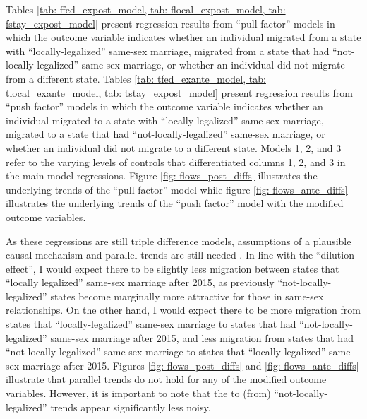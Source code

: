 \documentclass[12pt,letterpaper]{article}
\begin{document}
Tables \ref{tab: ffed_expost_model, tab: flocal_expost_model, tab: fstay_expost_model} present regression results from “pull factor” models in which the outcome variable indicates whether an individual migrated from a state with “locally-legalized” same-sex marriage, migrated from a state that had “not-locally-legalized” same-sex marriage, or whether an individual did not migrate from a different state. Tables \ref{tab: tfed_exante_model, tab: tlocal_exante_model, tab: tstay_expost_model} present regression results from “push factor” models in which the outcome variable indicates whether an individual migrated to a state with “locally-legalized” same-sex marriage, migrated to a state that had “not-locally-legalized” same-sex marriage, or whether an individual did not migrate to a different state. Models 1, 2, and 3 refer to the varying levels of controls that differentiated columns 1, 2, and 3 in the main model regressions.  Figure \ref{fig: flows_post_diffs} illustrates the underlying trends of the “pull factor” model while figure \ref{fig: flows_ante_diffs} illustrates the underlying trends of the “push factor” model with the modified outcome variables.

As these regressions are still triple difference models, assumptions of a plausible causal mechanism and parallel trends are still needed \citep{24, 25}. In line with the “dilution effect”, I would expect there to be slightly less migration between states that “locally legalized” same-sex marriage after 2015, as previously “not-locally-legalized” states become marginally more attractive for those in same-sex relationships. On the other hand, I would expect there to be more migration from states that “locally-legalized” same-sex marriage to states that had “not-locally-legalized” same-sex marriage after 2015, and less migration from states that had “not-locally-legalized” same-sex marriage to states that “locally-legalized” same-sex marriage after 2015. Figures \ref{fig: flows_post_diffs} and \ref{fig: flows_ante_diffs} illustrate that parallel trends do not hold for any of the modified outcome variables. However, it is important to note that the to (from) “not-locally-legalized” trends appear significantly less noisy.
\end{document}
